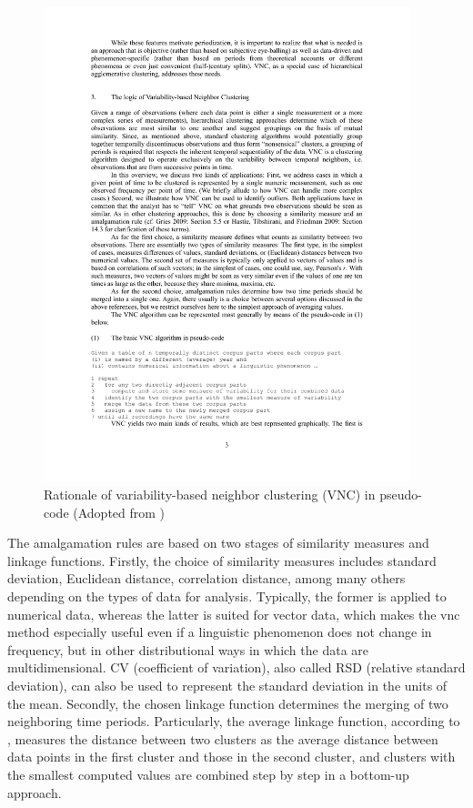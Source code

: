 \begin{figure}[H]
  \centering
  \includegraphics[width=0.95\textwidth,keepaspectratio]{figures_ref/Gries_and_Hilpert_2012_VNC_algo.pdf}
  \caption{Rationale of variability-based neighbor clustering (VNC) in pseudo-code (Adopted from \textcite{gries2012variability})}
  \label{fig:vnc_pseudocode}
\end{figure}

The amalgamation rules are based on two stages of similarity measures and linkage functions. Firstly, the choice of similarity measures includes standard deviation, Euclidean distance, correlation distance, among many others depending on the types of data for analysis. Typically, the former is applied to numerical data, whereas the latter is suited for vector data, which makes the \gls{vnc} method especially useful even if a linguistic phenomenon does not change in frequency, but in other distributional ways in which the data are multidimensional. CV (coefficient of variation), also called RSD (relative standard deviation), can also be used to represent the standard deviation in the units of the mean. Secondly, the chosen linkage function determines the merging of two neighboring time periods. Particularly, the average linkage function, according to , measures the distance between two clusters as the average distance between data points in the first cluster and those in the second cluster, and clusters with the smallest computed values are combined step by step in a bottom-up approach.

